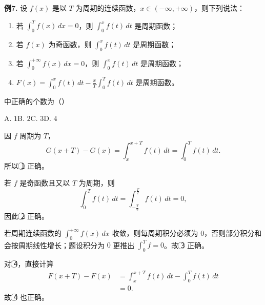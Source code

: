 \begin{problemblock}
\textbf{例7.} 设 \(f(x)\) 是以 \(T\) 为周期的连续函数，\(x\in(-\infty,+\infty)\)，则下列说法：
\begin{enumerate}[label=\textcircled{\arabic*}, leftmargin=2.2em]
\item 若 \(\displaystyle\int_0^T f(x)\,dx=0\)，则 \(\displaystyle\int_0^x f(t)\,dt\) 是周期函数；
\item 若 \(f(x)\) 为奇函数，则 \(\displaystyle\int_0^x f(t)\,dt\) 是周期函数；
\item 若 \(\displaystyle\int_0^{+\infty}f(x)\,dx=0\)，则 \(\displaystyle\int_0^x f(t)\,dt\) 是周期函数；
\item \(\displaystyle F(x)=\int_0^x f(t)\,dt-\frac{x}{T}\int_0^T f(t)\,dt\) 是周期函数。
\end{enumerate}
中正确的个数为（\quad）

A. \(1\)\qquad B. \(2\)\qquad C. \(3\)\qquad D. \(4\)
\end{problemblock}
\begin{solutionblock}
因 \(f\) 周期为 \(T\)，
\[
G(x+T)-G(x)=\int_x^{x+T}f(t)\,dt=\int_0^T f(t)\,dt.
\]
所以 \textcircled{1} 正确。

若 \(f\) 是奇函数且又以 \(T\) 为周期，则
\[
\int_0^T f(t)\,dt=\int_{-\frac T2}^{\frac T2}f(t)\,dt=0,
\]
因此 \textcircled{2} 正确。

若周期连续函数的 \(\int_0^{+\infty}f(x)\,dx\) 收敛，则每周期积分必须为 \(0\)，否则部分积分和会按周期线性增长；题设积分为 \(0\) 更推出 \(\int_0^T f=0\)。故 \textcircled{3} 正确。

对 \textcircled{4}，直接计算
\[
\begin{aligned}
F(x+T)-F(x)
&=\int_x^{x+T}f(t)\,dt-\int_0^T f(t)\,dt\\
&=0.
\end{aligned}
\]
故 \textcircled{4} 也正确。
\end{solutionblock}

